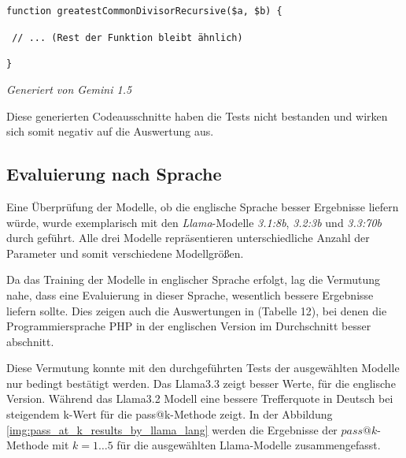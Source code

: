 \hrulefill

\texttt{function greatestCommonDivisorRecursive(\$a, \$b) \{}

\texttt{\hspace{0.6cm} // ... (Rest der Funktion bleibt ähnlich)}

\texttt{\}}

\begin{flushright}
	\textit{Generiert von Gemini 1.5}
\end{flushright}

\hrulefill

Diese generierten Codeausschnitte haben die Tests nicht bestanden und wirken sich somit negativ auf die Auswertung aus.\vspace{0.2cm}


\subsection{Evaluierung nach Sprache}
Eine Überprüfung der Modelle, ob die englische Sprache besser Ergebnisse liefern würde, wurde exemplarisch mit den \textit{Llama}-Modelle \textit{3.1:8b}, \textit{3.2:3b} und \textit{3.3:70b} durch geführt. Alle drei Modelle repräsentieren unterschiedliche Anzahl der Parameter und somit verschiedene Modellgrößen.\vspace{0.2cm}

Da das Training der Modelle in englischer Sprache erfolgt, lag die Vermutung nahe, dass eine Evaluierung in dieser Sprache, wesentlich bessere Ergebnisse liefern sollte. Dies zeigen auch die Auswertungen in \cite[][11]{peng-2024} (Tabelle 12), bei denen die Programmiersprache PHP in der englischen Version im Durchschnitt besser abschnitt.\vspace{0.2cm}

Diese Vermutung konnte mit den durchgeführten Tests der ausgewählten Modelle nur bedingt bestätigt werden. Das Llama3.3 zeigt besser Werte, für die englische Version. Während das Llama3.2 Modell eine bessere Trefferquote in Deutsch bei steigendem k-Wert für die pass@k-Methode zeigt. In der Abbildung \ref{img:pass_at_k_results_by_llama_lang} werden die Ergebnisse der $pass@k$-Methode mit $k=1 … 5$ für die ausgewählten Llama-Modelle zusammengefasst.\vspace{0.2cm}

